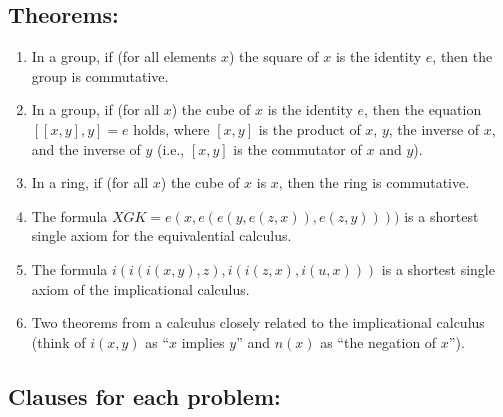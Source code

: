 \subsection*{Theorems:}
\begin{enumerate}
\item  In a group, if (for all elements $x$) the square of $x$ is the identity $e$, then 
    the group is commutative.

\item  In a group, if (for all $x$) the cube of $x$ is the identity $e$, then the 
    equation $[[x,y],y]=e$ holds, where $[x,y]$ is the product of $x$, $y$, 
    the inverse of $x$, and the inverse of $y$ (i.e., $[x,y]$ is the commutator of
    $x$ and $y$).

\item  In a ring, if (for all $x$) the cube of $x$ is $x$, then the ring is commutative.

\item  The formula $XGK = e(x,e(e(y,e(z,x)),e(z,y))))$ is a shortest single axiom 
    for the equivalential calculus.

\item  The formula $i(i(i(x,y),z),i(i(z,x),i(u,x)))$ is a shortest single axiom 
    of the implicational calculus.

\item  Two theorems from a calculus closely related to the implicational calculus
    (think of $i(x,y)$ as ``$x$ implies $y$'' and $n(x)$ as ``the negation of $x$'').
\end{enumerate}

\subsection*{Clauses for each problem:}

